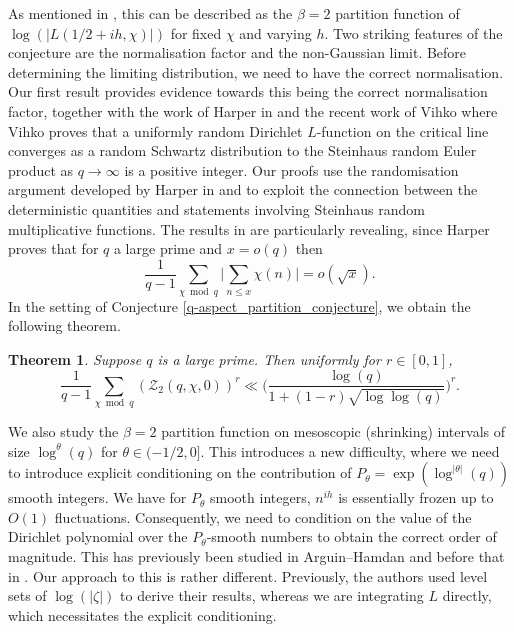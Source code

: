 \documentclass[10pt,a4paper]{amsart}
\newtheorem{theorem}{Theorem}
\numberwithin{equation}{section}
\begin{document}
As mentioned in \cite{harper2019partition}, this can be described as the $\beta=2$ partition function of $\log(|L(1/2+ih,\chi)|)$ for fixed $\chi$ and varying $h$. Two striking features of the conjecture are the normalisation factor and the non-Gaussian limit. Before determining the limiting distribution, we need to have the correct normalisation. Our first result provides evidence towards this being the correct normalisation factor, together with the work of Harper in \cite{harper2023typicalsizecharacterzeta} and the recent work of Vihko \cite{vihko2025dirichlet} where Vihko proves that a uniformly random Dirichlet $L$-function on the critical line converges as a random Schwartz distribution to the Steinhaus random Euler product as $q \to \infty$ is a positive integer. Our proofs use the randomisation argument developed by Harper in \cite{harper2019partition} and \cite{harper2023typicalsizecharacterzeta} to exploit the connection between the deterministic quantities and statements involving Steinhaus random multiplicative functions. The results in \cite{harper2023typicalsizecharacterzeta} are particularly revealing, since Harper proves that for $q$ a large prime and $x=o(q)$ then
$$\frac{1}{q-1}\sum_{\chi \bmod{q}}\big|\sum_{n \leq x}\chi(n)\big| = o(\sqrt{x}).$$
In the setting of Conjecture \ref{q-aspect_partition_conjecture}, we obtain the following theorem.
\begin{theorem}
Suppose $q$ is a large prime. Then uniformly for $r \in [0,1]$,
    $$\frac{1}{q-1}\sum_{\chi \bmod{q}}(\mathcal{Z}_2(q,\chi,0))^r \ll \big(\frac{\log(q)}{1+(1-r)\sqrt{\log\log(q)}}\big)^r.$$
    \label{pf_moments_constant}
\end{theorem}
We also study the $\beta=2$ partition function on mesoscopic (shrinking) intervals of size $\log^{\theta}(q)$ for $\theta \in (-1/2,0]$. This introduces a new difficulty, where we need to introduce explicit conditioning on the contribution of $P_\theta = \exp(\log^{|\theta|}(q))$ smooth integers. We have for $P_\theta$ smooth integers, $n^{ih}$ is essentially frozen up to $O(1)$ fluctuations. Consequently, we need to condition on the value of the Dirichlet polynomial over the $P_\theta$-smooth numbers to obtain the correct order of magnitude. This has previously been studied in Arguin--Hamdan \cite{ah24} and before that in \cite{aor21}. Our approach to this is rather different. Previously, the authors used level sets of $\log(|\zeta|)$ to derive their results, whereas we are integrating $L$ directly, which necessitates the explicit conditioning. \par
\end{document}
